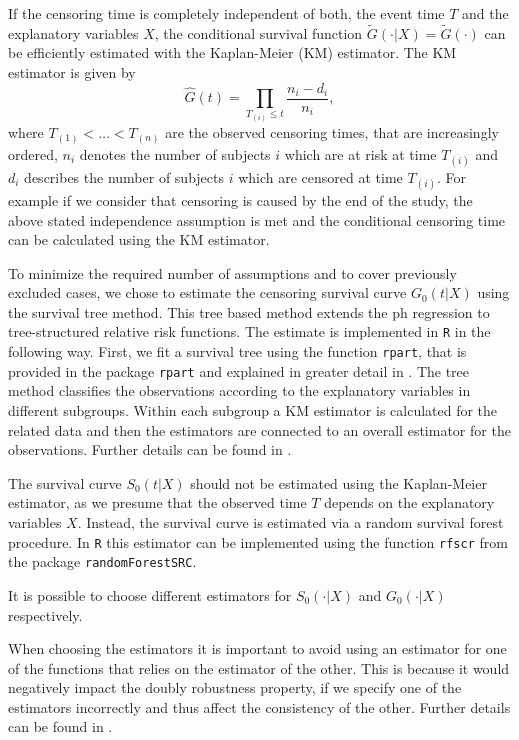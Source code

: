 \documentclass[12pt, a4paper]{scrartcl}
\theoremstyle{definition}
\theoremstyle{plain}
\numberwithin{equation}{section}
\numberwithin{figure}{section}
\numberwithin{table}{section}
\begin{document}
	If the censoring time is completely independent of both, the event time $T$ and the explanatory variables $X$, the conditional survival function $\tilde{G}(\cdot\vert X)=\tilde{G}(\cdot)$ can be efficiently estimated with the Kaplan-Meier (KM) estimator.
	The KM estimator is given by
	\begin{equation*}
		\hat{G}(t) = \prod_{T_{(i)}\leq t} \frac{n_i-d_i}{n_i},
	\end{equation*}
	where $T_{(1)}<\dots<T_{(n)}$ are the observed censoring times, that are increasingly ordered, $n_i$ denotes the number of subjects $i$ which are at risk at time $T_{(i)}$ and $d_i$ describes the number of subjects $i$ which are censored at time $T_{(i)}$.
	For example if we consider that censoring is caused by the end of the study, the above stated independence assumption is met and the conditional censoring time can be calculated using the KM estimator.
	
	To minimize the required number of assumptions and to cover previously excluded cases, we chose to estimate the censoring survival curve $G_0(t \vert X)$ using the survival tree method.
	This tree based method extends the ph regression to tree-structured relative risk functions.
	The estimate is implemented in \texttt{R} in the following way.
	First, we fit a survival tree using the function \texttt{rpart}, that is provided in the package \texttt{rpart} and explained in greater detail in \citet*{rpart}.
	The tree method classifies the observations according to the explanatory variables in different subgroups.
	Within each subgroup a KM estimator is calculated for the related data and then the estimators are connected to an overall estimator for the observations. %
	Further details can be found in \citet*{relativerisktrees}.
	
	The survival curve $S_0(t\vert X)$ should not be estimated using the Kaplan-Meier estimator, as we presume that the observed time $T$ depends on the explanatory variables $X$.
	Instead, the survival curve is estimated via a random survival forest procedure.
	In \texttt{R} this estimator can be implemented using the function \texttt{rfscr} from the package \texttt{randomForestSRC}. 
	
	It is possible to choose different estimators for $S_0(\cdot\vert X)$ and $G_0(\cdot\vert X)$ respectively.
	
	When choosing the estimators it is important to avoid using an estimator for one of the functions that relies on the estimator of the other.
	This is because it would negatively impact the doubly robustness property, if we specify one of the estimators incorrectly and thus affect the consistency of the other.
	Further details can be found in \citet*{drtrees}.
	
\end{document}

